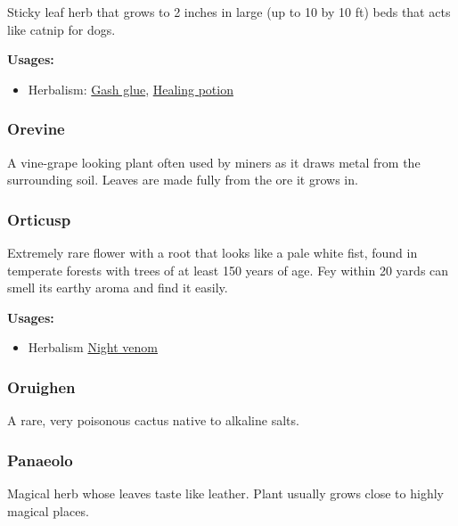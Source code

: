Sticky leaf herb that grows to 2 inches in large (up to 10 by 10 ft) beds that acts like catnip for dogs.

\vspace{5mm}

\textbf{Usages:}

\begin{itemize}[noitemsep]
\item[] Herbalism: \hyperref[Gash glue]{Gash glue}, \hyperref[healing_potion]{Healing potion}
\end{itemize}

\subsubsection{Orevine}

A vine-grape looking plant often used by miners as it draws metal from the surrounding soil. Leaves are made fully from the ore it grows in.

\subsubsection{Orticusp}
\label{Orticusp}

Extremely rare flower with a root that looks like a pale white fist, found in temperate forests with trees of at least 150 years of age. Fey within 20 yards can smell its earthy aroma and find it easily.

\vspace{5mm}

\textbf{Usages:}

\begin{itemize}[noitemsep]
\item[] Herbalism \hyperref[Night venom]{Night venom}
\end{itemize}

\subsubsection{Oruighen}

A rare, very poisonous cactus native to alkaline salts.

\subsubsection{Panaeolo}
\label{Panaeolo}

Magical herb whose leaves taste like leather. Plant usually grows close to highly magical places.

